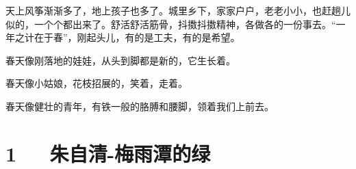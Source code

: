 \documentclass[letterpaper,10pt,english]{sphinxmanual}
\begin{document}
天上风筝渐渐多了，地上孩子也多了。城里乡下，家家户户，老老小小，也赶趟儿似的，一个个都出来了。舒活舒活筋骨，抖擞抖擞精神，各做各的一份事去。“一年之计在于春”，刚起头儿，有的是工夫，有的是希望。

春天像刚落地的娃娃，从头到脚都是新的，它生长着。

春天像小姑娘，花枝招展的，笑着，走着。

春天像健壮的青年，有铁一般的胳膊和腰脚，领着我们上前去。


\chapter{1   朱自清-梅雨潭的绿}
\label{\detokenize{p01_u6563_u6587/_u6731_u81ea_u6e05-_u6885_u96e8_u6f6d_u7684_u7eff:id1}}\label{\detokenize{p01_u6563_u6587/_u6731_u81ea_u6e05-_u6885_u96e8_u6f6d_u7684_u7eff::doc}}
\end{document}
